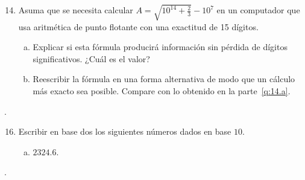 \begin{frame}
	\begin{enumerate}\setcounter{enumi}{13}
		\item

		      Asuma que se necesita calcular
		      \begin{math}
			      A=
			      \sqrt{10^{14}+\frac{2}{3}}-10^{7}
		      \end{math}
		      en un computador que usa aritmética de punto flotante con
		      una exactitud de 15 dígitos.

		      \begin{enumerate}[a)]
			      \item\label{q:14.a}

			      Explicar si esta fórmula producirá información sin
			      pérdida de dígitos significativos.
			      ¿Cuál es el valor?

			      \item\label{q:14.b}

			      Reescribir la fórmula en una forma alternativa de
			      modo que un cálculo más exacto sea posible.
			      Compare con lo obtenido en la parte~\eqref{q:14.a}.
		      \end{enumerate}
	\end{enumerate}

	\begin{solution}
		.
	\end{solution}
\end{frame}

\begin{frame}
	\begin{enumerate}\setcounter{enumi}{15}
		\item

		      Escribir en base dos los siguientes números dados en base $10$.


		      \begin{enumerate}[a)]
			      \item

			            $2324.6$.
		      \end{enumerate}
	\end{enumerate}

	\begin{solution}
		.
	\end{solution}
\end{frame}

